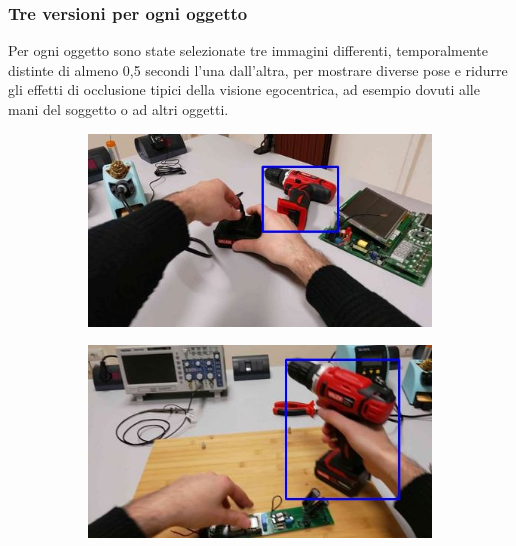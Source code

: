 \subsubsection*{Tre versioni per ogni oggetto}
Per ogni oggetto sono state selezionate tre immagini differenti, temporalmente distinte di almeno 0,5 secondi l'una dall'altra, per mostrare diverse pose e ridurre gli effetti di occlusione tipici della visione egocentrica, ad esempio dovuti alle mani del soggetto o ad altri oggetti.

\begin{figure}[ht]
    \centering
    \begin{subfigure}[b]{0.32\linewidth}
        \includegraphics[width=\linewidth]{Images/enigma_am_IMGVER1.jpg}
        \caption{}
        \label{fig:imgver1}
    \end{subfigure}
    \hfill
    \begin{subfigure}[b]{0.32\linewidth}
        \includegraphics[width=\linewidth]{Images/enigma_am_IMGVER2.jpg}
        \caption{}
        \label{fig:imgver2}
    \end{subfigure}
    \hfill
    \begin{subfigure}[b]{0.32\linewidth}

\end{subfigure}
\end{figure}

